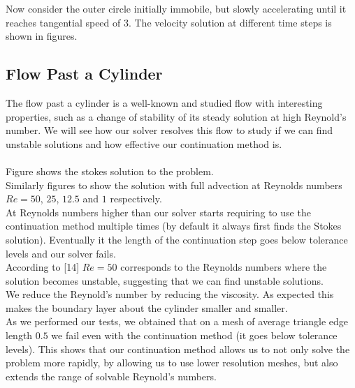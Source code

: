 \documentclass[11pt,twoside,a4paper]{article}
\begin{document}
Now consider the outer circle initially immobile, but slowly accelerating until it reaches tangential speed of $3$. The velocity solution at different time steps is shown in figures.

\subsection{Flow Past a Cylinder}

The flow past a cylinder is a well-known and studied flow with interesting properties, such as a change of stability of its steady solution at high Reynold's number.
We will see how our solver resolves this flow to study if we can find unstable solutions and how effective our continuation method is.\\
\\
Figure shows the stokes solution to the problem.\\
Similarly figures to show the solution with full advection at Reynolds numbers $Re = 50$, $25$, $12.5$ and $1$ respectively.\\
At Reynolds numbers higher than our solver starts requiring to use the continuation method multiple times (by default it always first finds the Stokes solution). Eventually it the length of the continuation step goes below tolerance levels and our solver fails.\\
According to [14] $Re = 50$ corresponds to the Reynolds numbers where the solution becomes unstable, suggesting that we can find unstable solutions.\\
We reduce the Reynold's number by reducing the viscosity. As expected this makes the boundary layer about the cylinder smaller and smaller.\\
As we performed our tests, we obtained that on a mesh of average triangle edge length $0.5$ we fail even with the continuation method (it goes below tolerance levels). This shows that our continuation method allows us to not only solve the problem more rapidly, by allowing us to use lower resolution meshes, but also extends the range of solvable Reynold's numbers.
\end{document}
